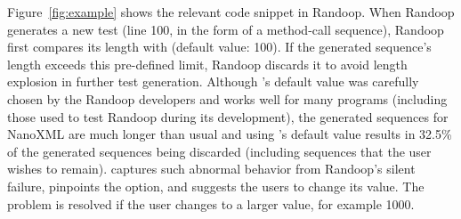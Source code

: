 Figure~\ref{fig:example} shows the relevant code snippet
in Randoop.  When Randoop generates a new test (line 100, in the form of
a method-call sequence),
Randoop first compares its length with 
(default value: 100). If the
generated sequence's length exceeds this pre-defined limit,
Randoop discards it to avoid length explosion in further
test generation.
Although 's default value was carefully chosen
by the Randoop developers
and works well for many programs (including those used to test
Randoop during its development), the generated sequences for NanoXML
are much longer than usual and using 's default value
results in 32.5\% of the generated sequences being discarded
(including sequences that the user wishes to remain).
\ourtool captures such abnormal behavior from Randoop's
silent failure, pinpoints the
 option, and suggests the users to change its value.
The problem is resolved if
the user changes  to a larger value, for example 1000.





